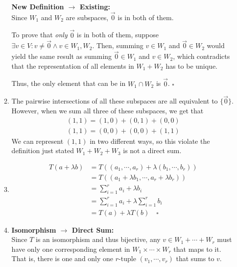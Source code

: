 \documentclass[12pt]{article}
\begin{document}
\begin{enumerate}
\begin{enumerate}
                        \textbf{New Definition $\rightarrow$ Existing:} \\
                        Since $W_1$ and $W_2$ are subspaces, $\vec{0}$ is in both of them.

                        To prove that \textit{only} $\vec{0}$ is in both of them, suppose $\exists v \in V: v \ne \vec{0}\land v \in W_1, W_2$.
                        Then, summing $v \in W_1$ and $\vec{0} \in W_2$ would yield the same result as summing $\vec{0} \in W_1$ and $v \in W_2$,
                        which contradicts that the representation of all elements in $W_1+W_2$ has to be unique.

                        Thus, the only element that can be in $W_1 \cap W_2$ is $\vec{0}$. $\square$
                  \item The pairwise intersections of all these subspaces are all equivalent to $\{\vec{0}\}$.
                        However, when we sum all three of these subspaces, we get that
                        \begin{gather*}
                              (1,1)=(1,0)+(0,1)+(0,0) \\
                              (1,1)=(0,0)+(0,0)+(1,1)
                        \end{gather*}
                        We can represent $(1, 1)$ in two different ways, so
                        this violate the definition just stated $W_1+W_2+W_3$ is not a direct sum.
                  \item \begin{align*}
                              T(a+\lambda b) & = T((a_1, \cdots, a_r)+\lambda(b_1, \cdots, b_r)) \\
                                             & = T((a_1+\lambda b_1, \cdots, a_r+\lambda b_r))   \\
                                             & = \sum_{i=1}^{r} a_i + \lambda b_i                \\
                                             & = \sum_{i=1}^{r} a_i + \lambda \sum_{i=1}^{r} b_i \\
                                             & = T(a)+\lambda T(b)\quad\square
                        \end{align*}
                  \item \textbf{Isomorphism $\rightarrow$ Direct Sum:} \\
                        Since $T$ is an isomorphism and thus bijective, any $v \in W_1 + \cdots + W_r$ must have only one corresponding
                        element in $W_1 \times \cdots \times W_r$ that maps to it.
                        That is, there is one and only one $r$-tuple $(v_1, \cdots, v_r)$ that sums to $v$.


\end{enumerate}
\end{enumerate}
\end{document}
